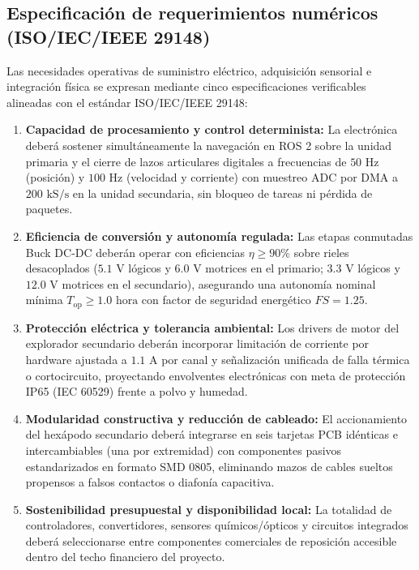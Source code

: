 \subsection{Especificación de requerimientos numéricos (ISO/IEC/IEEE 29148)}

Las necesidades operativas de suministro eléctrico, adquisición sensorial e integración física se expresan mediante cinco especificaciones verificables alineadas con el estándar ISO/IEC/IEEE 29148:

\begin{enumerate}
    \item \textbf{Capacidad de procesamiento y control determinista:} La electrónica deberá sostener simultáneamente la navegación en ROS 2 sobre la unidad primaria y el cierre de lazos articulares digitales a frecuencias de $50\text{ Hz}$ (posición) y $100\text{ Hz}$ (velocidad y corriente) con muestreo ADC por DMA a $200\text{ kS/s}$ en la unidad secundaria, sin bloqueo de tareas ni pérdida de paquetes.
    \item \textbf{Eficiencia de conversión y autonomía regulada:} Las etapas conmutadas Buck DC-DC deberán operar con eficiencias $\eta \ge 90\%$ sobre rieles desacoplados ($5.1\text{ V}$ lógicos y $6.0\text{ V}$ motrices en el primario; $3.3\text{ V}$ lógicos y $12.0\text{ V}$ motrices en el secundario), asegurando una autonomía nominal mínima $T_{\text{op}} \ge 1.0\text{ hora}$ con factor de seguridad energético $FS = 1.25$.
    \item \textbf{Protección eléctrica y tolerancia ambiental:} Los drivers de motor del explorador secundario deberán incorporar limitación de corriente por hardware ajustada a $1.1\text{ A}$ por canal y señalización unificada de falla térmica o cortocircuito, proyectando envolventes electrónicas con meta de protección IP65 (IEC 60529) frente a polvo y humedad.
    \item \textbf{Modularidad constructiva y reducción de cableado:} El accionamiento del hexápodo secundario deberá integrarse en seis tarjetas PCB idénticas e intercambiables (una por extremidad) con componentes pasivos estandarizados en formato SMD 0805, eliminando mazos de cables sueltos propensos a falsos contactos o diafonía capacitiva.
    \item \textbf{Sostenibilidad presupuestal y disponibilidad local:} La totalidad de controladores, convertidores, sensores químicos/ópticos y circuitos integrados deberá seleccionarse entre componentes comerciales de reposición accesible dentro del techo financiero del proyecto.
\end{enumerate}

